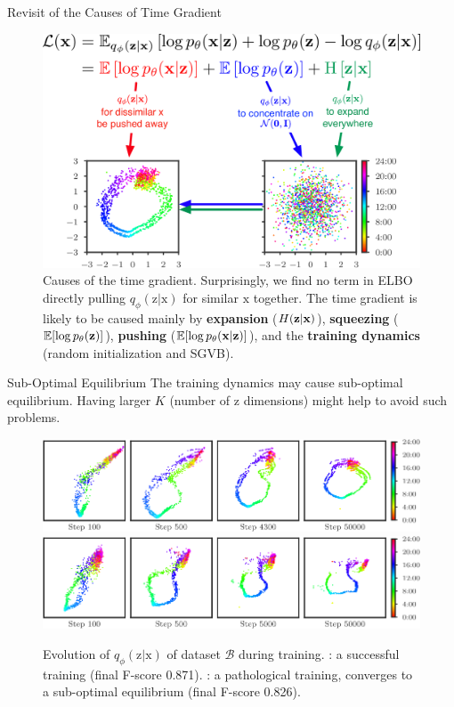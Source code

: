 \documentclass[usenames,dvipsnames]{beamer}
\newcommand{\DATASETB}{$\mathcal{B}$}
\newcommand{\emphasis}[1]{\textbf{\textcolor{emphcolor}{#1}}}
\let\originalleft\left
\let\originalright\right
\newcommand{\mleft}{\mathopen{}\mathclose\bgroup\originalleft}
\newcommand{\mright}{\aftergroup\egroup\originalright}
\newcommand{\vv}[1]{\bm{\mathrm{{#1}}}}
\newcommand{\EE}[1]{\operatorname{\mathbb{E}}\mleft[{#1}\mright]}
\newcommand{\Entropy}{H}
\newcommand{\Entropyy}[1]{\Entropy\mleft({#1}\mright)}
\begin{document}
\begin{frame}{Revisit of the Causes of Time Gradient}
  \begin{figure}
    \includegraphics[height=.63\textheight]{time-gradient-causes}
    \caption{
      Causes of the time gradient.
      Surprisingly, we find no term in ELBO directly pulling $q_{\phi}(\vv{z}|\vv{x})$ for similar $\vv{x}$ together.
      The time gradient is likely to be caused mainly by \emphasis{expansion} ($\Entropyy{\vv{z}|\vv{x}}$), \emphasis{squeezing} ($\EE{\log p_{\theta}(\vv{z})}$), \emphasis{pushing} ($\EE{\log p_{\theta}(\vv{x}|\vv{z})}$), and the \emphasis{training dynamics} (random initialization and SGVB).  
    }
  \end{figure}
\end{frame}

\begin{frame}{Sub-Optimal Equilibrium}
  The training dynamics may cause sub-optimal equilibrium.  Having larger $K$ (number of $\vv{z}$ dimensions) might help to avoid such problems.

  \begin{figure}
    \includegraphics[height=.28\textheight]{z2_dynamic_latent_space}\\
    \includegraphics[height=.28\textheight]{z2_dynamic_latent_space_failed}
    \caption{
      Evolution of $q_{\phi}(\vv{z}|\vv{x})$ of dataset \DATASETB{} during training.
      : a successful training (final F-score 0.871). : a pathological training, converges to a sub-optimal equilibrium (final F-score 0.826).
    }
  \end{figure}
\end{frame}
\end{document}
